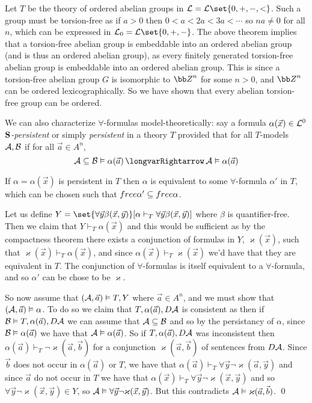 \bexam

    Let $T$ be the theory of ordered abelian groups in ${\cal L}={\cal L}\set{0,+,-,<}$.
    Such a group must be torsion-free as if $a>0$ then $0<a<2a<3a<\cdots$ so $na\neq0$ for all $n$, which can be expressed in ${\cal L}_0={\cal L}\set{0,+,-}$.
    The above theorem implies that a torsion-free abelian group is embeddable into an ordered abelian group (and is thus an ordered abelian group), as every finitely generated torsion-free abelian group
    is embeddable into an ordered abelian group.
    This is since a torsion-free abelian group $G$ is isomorphic to ${\bb Z}^n$ for some $n>0$, and ${\bb Z}^n$ can be ordered lexicographically.
    So we have shown that every abelian torsion-free group can be ordered.

\eexam

We can also characterize $\forall$-formulas model-theoretically: say a formula $\alpha(\vec x)\in{\cal L}^0$ {\it ${\bf S}$-persistent} or simply {\it persistent}
in a theory $T$ provided that for all $T$-models ${\cal A},{\cal B}$ if for all $\vec a\in A^n$,
$$ {\cal A}\subseteq{\cal B}\vDash\alpha(\vec a)\implies {\cal A}\vDash\alpha(\vec a) $$

\bthrm[name=persequivuniversal]

    If $\alpha=\alpha(\vec x)$ is persistent in $T$ then $\alpha$ is equivalent to some $\forall$-formula $\alpha'$ in $T$, which can be chosen such that ${\sl free}\alpha'\subseteq{\sl free}\alpha$.

\ethrm

Let us define $Y=\set{\forall\vec y\beta(\vec x,\vec y)}[\alpha\vdash_T\forall\vec y\beta(\vec x,\vec y)]$ where $\beta$ is quantifier-free.
Then we claim that $Y\vdash_T\alpha(\vec x)$ and this would be sufficient as by the compactness theorem there exists a conjunction of formulas in $Y$, $\varkappa(\vec x)$, such that
$\varkappa(\vec x)\vdash_T\alpha(\vec x)$, and since $\alpha(\vec x)\vdash_T\varkappa(\vec x)$ we'd have that they are equivalent in $T$.
The conjunction of $\forall$-formulas is itself equivalent to a $\forall$-formula, and so $\alpha'$ can be chose to be $\varkappa$.

So now assume that $({\cal A},\vec a)\vDash T,Y$ where $\vec a\in A^n$, and we must show that $({\cal A},\vec a)\vDash\alpha$.
To do so we claim that $T,\alpha(\vec a),D{\cal A}$ is consistent as then if ${\cal B}\vDash T,\alpha(\vec a),D{\cal A}$ we can assume that ${\cal A}\subseteq{\cal B}$ and so by the persistancy of $\alpha$,
since ${\cal B}\vDash\alpha(\vec a)$ we have that ${\cal A}\vDash\alpha(\vec a)$.
So if $T,\alpha(\vec a),D{\cal A}$ was inconsistent then $\alpha(\vec a)\vdash_T\neg\varkappa(\vec a,\vec b)$ for a conjunction $\varkappa(\vec a,\vec b)$ of sentences from $D{\cal A}$.
Since $\vec b$ does not occur in $\alpha(\vec a)$ or $T$, we have that $\alpha(\vec a)\vdash_T\forall\vec y\neg\varkappa(\vec a,\vec y)$ and since $\vec a$ do not occur in $T$ we have that
$\alpha(\vec x)\vdash_T\forall\vec y\neg\varkappa(\vec x,\vec y)$ and so $\forall\vec y\neg\varkappa(\vec x,\vec y)\in Y$, so ${\cal A}\vDash\forall\vec y\neg\varkappa(\vec x,\vec y)$.
But this contradicts ${\cal A}\vDash\varkappa(\vec a,\vec b)$.
\qed

